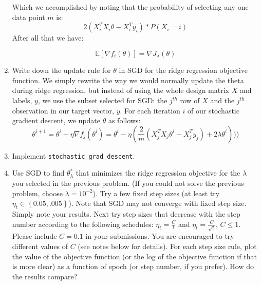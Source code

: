 \documentclass{article}
\begin{document}
\begin{enumerate}
Which we accomplished by noting that the probability of selecting any one data point $m$ is:
$$2(X_i^TX_i\theta - X_i^Ty_i) * P(X_i = i)$$
After all that we have:
    
    $$\mathbb{E}[\nabla f_{i}(\theta)] = \nabla J_\lambda(\theta)$$ 
 

\item Write down the update rule for $\theta$ in SGD for the ridge
regression objective function.
\subitem
We simply rewrite the way we would normally update the theta during ridge regression, but instead of using the whole design matrix $X$ and labels, $y$, we use the subset selected for SGD: the $j^{th}$ row of $X$ and the $j^{th}$ observation in our target vector, $y$. For each iteration $i$ of our stochastic gradient descent, we update $\theta$ as follows:
$$\theta^{i+1} = \theta^i - \eta \nabla f_j(\theta^i) = \theta^i - \eta (\frac{2}{m} (X_j^TX_j\theta^i - X_j^Ty_j) + 2\lambda \theta^i)))$$

\item Implement \texttt{stochastic\_grad\_descent}. 

\item Use SGD to find $\theta_{\lambda}^{*}$ that minimizes the ridge regression
objective for the $\lambda$ you selected in the previous
problem. (If you could not solve the previous problem, choose $\lambda=10^{-2}$). Try a few fixed step sizes (at least try $\eta_{t}\in\left\{ 0.05,.005\right\} $).
Note that SGD may not converge with fixed step size. Simply note your
results. Next try step sizes that decrease with the step number according
to the following schedules: $\eta_{t}=\frac{C}{t}$ and $\eta_{t}=\frac{C}{\sqrt{t}}$, $C \leq 1$. Please include $C = 0.1$ in your submissions. You are encouraged to try different values of $C$ (see notes below for details).
For each step size rule, plot the value of the objective function
(or the log of the objective function if that is more clear) as a
function of epoch (or step number, if you prefer). How do the results compare?

\setcounter{saveenum}{\value{enumi}}
\end{enumerate}
\end{document}
